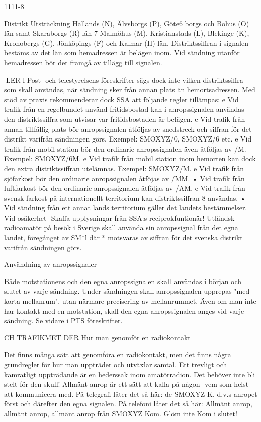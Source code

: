 1111-8

Distrikt Utsträckning
Hallands (N), Älvsborgs (P), Göte6
borgs och Bohus (O) län samt Skaraborgs (R) län
7
Malmöhus (M), Kristianstads (L),
Blekinge (K), Kronobergs (G),
Jönköpings (F) och Kalmar (H) län.
Distriktssiffran i signalen bestäms av det
län som hemadressen är belägen inom. Vid
sändning utanför hemadressen bör det
framgå av tillägg till signalen.

LER
l Post- och telestyrelsens föreskrifter sägs
dock inte vilken distriktssiffra som skall användas, när sändning sker från annan plats
än hemortsadressen.
Med stöd av praxis rekommenderar dock
SSA att följande regler tillämpas:
e
Vid trafik från en regelbundet använd
fritidsbostad kan i anropssignalen användas den distriktssiffra som utvisar var
fritidsbostaden är belägen.
e
Vid trafik från annan tillfällig plats bör
anropssignalen åtföljas av snedstreck och
siffran för det distrikt varifrån sändningen
görs.
Exempel: SMOXYZ/0, SMOXYZ/6 etc.
e
Vid trafik från mobil station bör den ordinarie anropssignalen även åtföljas av /M.
Exempel: SMOXYZ/6M.
e
Vid trafik från mobil station inom hemorten kan dock den extra distriktssiffran
utelämnas.
Exempel: SMOXYZ/M.
e
Vid trafik från sjöfarkost bör den ordinarie
anropssignalen åtföjas av /MM.
• Vid trafik från luftfarkost bör den ordinarie
anropssignalen åtföljas av /AM.
e
Vid trafik från svensk farkost på internationellt territorium kan distriktssiffran 8
användas.
• Vid sändning från ett annat lands territorium gäller det landets bestämmelser.
Vid osäkerhet- Skaffa upplysningar från
SSA:s reciprokfuntionär!
Utländsk radioamatör på besök i Sverige
skall använda sin anropssignal från det egna
landet, föregånget av SM*l där * motsvaras
av siffran för det svenska distrikt varifrån
sändningen görs.

Användning av anropssignaler

Både motstationens och den egna anropssignalen skall användas i början och slutet
av varje sändning.
Under sändningen skall anropssignalen
upprepas "med korta mellanrum", utan närmare precisering av mellanrummet.
Även om man inte har kontakt med en
motstation, skall den egna anropssignalen
anges vid varje sändning.
Se vidare i PTS föreskrifter.

CH TRAFIKMET DER
Hur man genomför en radiokontakt

Det finns många sätt att genomföra en radiokontakt, men det finns några grundregler för
hur man uppträder och utväxlar samtal. Ett
trevligt och kamratligt uppträdande är en
hederssak inom amatörradion. Det behöver
inte bli stelt för den skull!
Allmänt anrop är ett sätt att kalla på någon
-vem som helst- att kommunicera med.
På telegrafi låter det så här:
de SMOXYZ K, d.v.s anropet
först och därefter den egna signalen.
På telefoni låter det så här:
Allmänt anrop, allmänt anrop, allmänt anrop
från SMOXYZ Kom. Glöm inte Kom i slutet!

